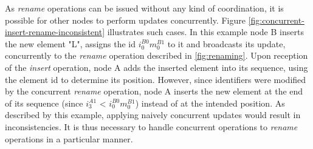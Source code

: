 \documentclass[10pt,journal,compsoc]{IEEEtran}
\newcommand{\trm}[1]{\mathit{#1}}
\newcommand{\id}[3]{$\trm{#1}^{\trm{#2}}_{\trm{#3}}$}
\begin{document}
\label{sec:dealing-with-concurrent-updates}

As \emph{rename} operations can be issued without any kind of coordination, it is possible for other nodes to perform updates concurrently.
Figure \ref{fig:concurrent-insert-rename-inconsistent} illustrates such cases.
In this example node B inserts the new element "L", assigns the id \id{i}{B0}{0}\id{m}{B1}{0} to it and broadcasts its update, concurrently to the \emph{rename} operation described in \autoref{fig:renaming}.
Upon reception of the \emph{insert} operation, node A adds the inserted element into its sequence, using the element id to determine its position.
However, since identifiers were modified by the concurrent \emph{rename} operation, node A inserts the new element at the end of its sequence (since \id{i}{A1}{3} < \id{i}{B0}{0}\id{m}{B1}{0}) instead of at the intended position.
As described by this example, applying naively concurrent updates would result in inconsistencies.
It is thus necessary to handle concurrent operations to \emph{rename} operations in a particular manner.
\end{document}
